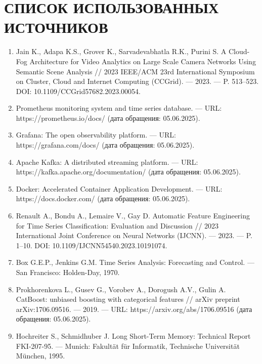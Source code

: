 \chapter*{СПИСОК ИСПОЛЬЗОВАННЫХ ИСТОЧНИКОВ}


\begin{enumerate}[label=\arabic*)\hspace{1em}, leftmargin=1cm, itemsep=0em]
	\item Jain K., Adapa K.S., Grover K., Sarvadevabhatla R.K., Purini S. A Cloud-Fog Architecture for Video Analytics on Large Scale Camera Networks Using Semantic Scene Analysis // 2023 IEEE/ACM 23rd International Symposium on Cluster, Cloud and Internet Computing (CCGrid). — 2023. — P. 513–523. DOI: 10.1109/CCGrid57682.2023.00054.
	\item Prometheus monitoring system and time series database. — URL: https://prometheus.io/docs/ (дата обращения: 05.06.2025).
	\item Grafana: The open observability platform. — URL: https://grafana.com/docs/ (дата обращения: 05.06.2025).
	\item Apache Kafka: A distributed streaming platform. — URL: https://kafka.apache.org/documentation/ (дата обращения: 05.06.2025).
	\item Docker: Accelerated Container Application Development. — URL: https://docs.docker.com/ (дата обращения: 05.06.2025).
	\item Renault A., Bondu A., Lemaire V., Gay D. Automatic Feature Engineering for Time Series Classification: Evaluation and Discussion // 2023 International Joint Conference on Neural Networks (IJCNN). — 2023. — P. 1–10. DOI: 10.1109/IJCNN54540.2023.10191074.
	\item Box G.E.P., Jenkins G.M. Time Series Analysis: Forecasting and Control. — San Francisco: Holden-Day, 1970.
	\item Prokhorenkova L., Gusev G., Vorobev A., Dorogush A.V., Gulin A. CatBoost: unbiased boosting with categorical features // arXiv preprint arXiv:1706.09516. — 2019. — URL: https://arxiv.org/abs/1706.09516 (дата обращения: 05.06.2025).
	\item Hochreiter S., Schmidhuber J. Long Short-Term Memory: Technical Report FKI-207-95. — Munich: Fakultät für Informatik, Technische Universität München, 1995.
\end{enumerate}